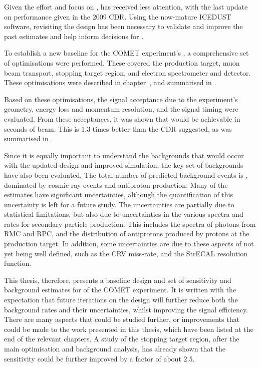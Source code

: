Given the effort and focus on \phaseI,  \phaseII has received less attention, with the last update on performance given in the 2009 CDR.
Using the now-mature ICEDUST software, revisiting the \phaseII design has been necessary to validate and improve the past estimates and help inform decisions for \phaseI.

To establish a new baseline for the COMET experiment's \phaseII, a comprehensive set of optimisations were performed.
These covered the production target, muon beam transport, stopping target region, and electron spectrometer and detector.
These optimisations were described in chapter~, and summarised in .

Based on these optimisations, the signal acceptance due to the experiment's geometry, energy loss and momentum resolution, and the signal timing were evaluated.
From these acceptances, it was shown that \VarPredictedSES would be achievable in \VarRunTime seconds of beam.
This is 1.3 times better than the \phaseII CDR suggested, as was summarised in .

Since it is equally important to understand the backgrounds that would occur with the updated design and improved simulation, 
the key set of backgrounds have also been evaluated.
The total number of predicted background events is \VarTotalBgPhasII, dominated by cosmic ray events and antiproton production.
Many of the estimates have significant uncertainties, although the quantification of this uncertainty is left for a future study.
The uncertainties are partially due to statistical limitations, but also due to uncertainties in the various spectra and rates for secondary particle production.
This includes the spectra of photons from \acl{RMC} and \acl{RPC}, and the distribution of antiprotons produced by protons at the production target.
In addition, some uncertainties are due to these aspects of \phaseII not yet being well defined, such as the \ac{CRV} miss-rate, and the StrECAL resolution function.

This thesis, therefore, presents a baseline design and set of sensitivity and background estimates for \phaseII of the COMET experiment.
It is written with the expectation that future iterations on the design will further reduce both the background rates and their uncertainties, whilst improving the signal efficiency.
There are many aspects that could be studied further, or improvements that could be made to the work presented in this thesis, which have been listed at the end of the relevant chapters.
A study of the stopping target region, after the main optimisation and background analysis, has already shown that the sensitivity could be further improved by a factor of about 2.5.

